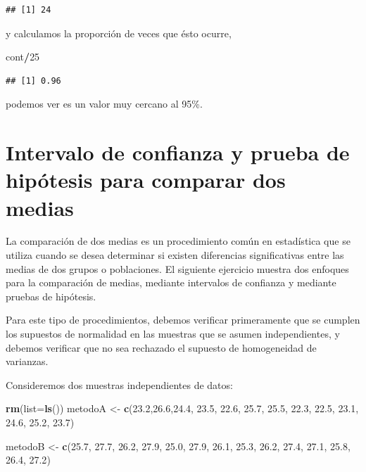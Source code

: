 \documentclass[
]{book}
\newenvironment{Shaded}{\begin{snugshade}}{\end{snugshade}}
\newcommand{\AttributeTok}[1]{\textcolor[rgb]{0.13,0.29,0.53}{#1}}
\newcommand{\DecValTok}[1]{\textcolor[rgb]{0.00,0.00,0.81}{#1}}
\newcommand{\FloatTok}[1]{\textcolor[rgb]{0.00,0.00,0.81}{#1}}
\newcommand{\FunctionTok}[1]{\textcolor[rgb]{0.13,0.29,0.53}{\textbf{#1}}}
\newcommand{\NormalTok}[1]{#1}
\newcommand{\OtherTok}[1]{\textcolor[rgb]{0.56,0.35,0.01}{#1}}
\newcommand{\SpecialCharTok}[1]{\textcolor[rgb]{0.81,0.36,0.00}{\textbf{#1}}}
\begin{document}
\begin{verbatim}
## [1] 24
\end{verbatim}

y calculamos la proporción de veces que ésto ocurre,

\begin{Shaded}
\begin{Highlighting}[]
\NormalTok{cont}\SpecialCharTok{/}\DecValTok{25}
\end{Highlighting}
\end{Shaded}

\begin{verbatim}
## [1] 0.96
\end{verbatim}

podemos ver es un valor muy cercano al 95\%.

\hypertarget{intervalo-de-confianza-y-prueba-de-hipuxf3tesis-para-comparar-dos-medias}{%
\chapter{Intervalo de confianza y prueba de hipótesis para comparar dos medias}\label{intervalo-de-confianza-y-prueba-de-hipuxf3tesis-para-comparar-dos-medias}}

La comparación de dos medias es un procedimiento común en estadística que se utiliza cuando se desea determinar si existen diferencias significativas entre las medias de dos grupos o poblaciones. El siguiente ejercicio muestra dos enfoques para la comparación de medias, mediante intervalos de confianza y mediante pruebas de hipótesis.

Para este tipo de procedimientos, debemos verificar primeramente que se cumplen los supuestos de normalidad en las muestras que se asumen independientes, y debemos verificar que no sea rechazado el supuesto de homogeneidad de varianzas.

Consideremos dos muestras independientes de datos:

\begin{Shaded}
\begin{Highlighting}[]
\FunctionTok{rm}\NormalTok{(}\AttributeTok{list=}\FunctionTok{ls}\NormalTok{())}
\NormalTok{metodoA }\OtherTok{\textless{}{-}} \FunctionTok{c}\NormalTok{(}\FloatTok{23.2}\NormalTok{,}\FloatTok{26.6}\NormalTok{,}\FloatTok{24.4}\NormalTok{, }\FloatTok{23.5}\NormalTok{, }\FloatTok{22.6}\NormalTok{, }\FloatTok{25.7}\NormalTok{, }\FloatTok{25.5}\NormalTok{, }\FloatTok{22.3}\NormalTok{, }
             \FloatTok{22.5}\NormalTok{, }\FloatTok{23.1}\NormalTok{, }\FloatTok{24.6}\NormalTok{, }\FloatTok{25.2}\NormalTok{, }\FloatTok{23.7}\NormalTok{)}

\NormalTok{metodoB }\OtherTok{\textless{}{-}} \FunctionTok{c}\NormalTok{(}\FloatTok{25.7}\NormalTok{, }\FloatTok{27.7}\NormalTok{, }\FloatTok{26.2}\NormalTok{, }\FloatTok{27.9}\NormalTok{, }\FloatTok{25.0}\NormalTok{, }\FloatTok{27.9}\NormalTok{, }\FloatTok{26.1}\NormalTok{, }\FloatTok{25.3}\NormalTok{, }
             \FloatTok{26.2}\NormalTok{, }\FloatTok{27.4}\NormalTok{, }\FloatTok{27.1}\NormalTok{, }\FloatTok{25.8}\NormalTok{, }\FloatTok{26.4}\NormalTok{, }\FloatTok{27.2}\NormalTok{)}
\end{Highlighting}
\end{Shaded}
\end{document}
